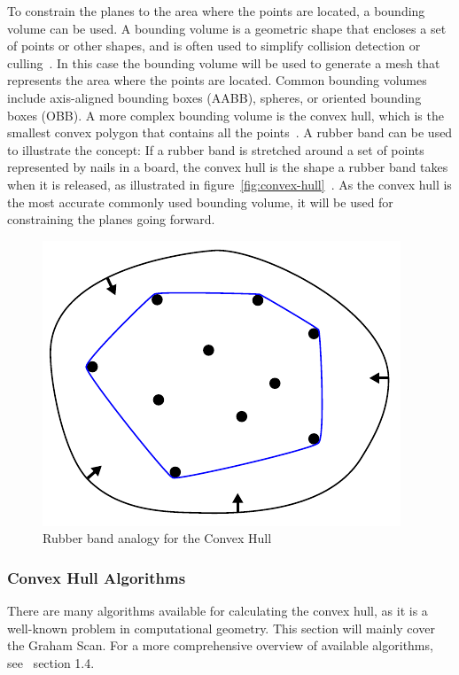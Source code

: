 To constrain the planes to the area where the points are located, a bounding volume can be used.
A bounding volume is a geometric shape that encloses a set of points or other shapes,
and is often used to simplify collision detection or culling~\cite{gabriel_zachmann_geometric_2002}.
In this case the bounding volume will be used to generate a mesh that represents the area where the points are located.
Common bounding volumes include axis-aligned bounding boxes (AABB), spheres, or oriented bounding boxes (OBB).
A more complex bounding volume is the convex hull, which is the smallest convex polygon that contains all the points~\cite{gabriel_zachmann_geometric_2002}.
A rubber band can be used to illustrate the concept: If a rubber band is stretched around a set of points represented by nails in a board,
the convex hull is the shape a rubber band takes when it is released, as illustrated in figure~\ref{fig:convex-hull}~\cite{de_berg_computational_2008}.
As the convex hull is the most accurate commonly used bounding volume,
it will be used for constraining the planes going forward.

\begin{figure}[ht!]
    \centering
    \includegraphics[width=0.25\linewidth]{images/ConvexHull}
    \caption{Rubber band analogy for the Convex Hull}
\end{figure}

\subsubsection{Convex Hull Algorithms}
There are many algorithms available for calculating the convex hull, as it is a well-known problem in computational geometry.
This section will mainly cover the Graham Scan.
For a more comprehensive overview of available algorithms, see~\cite{de_berg_computational_2008} section 1.4.

